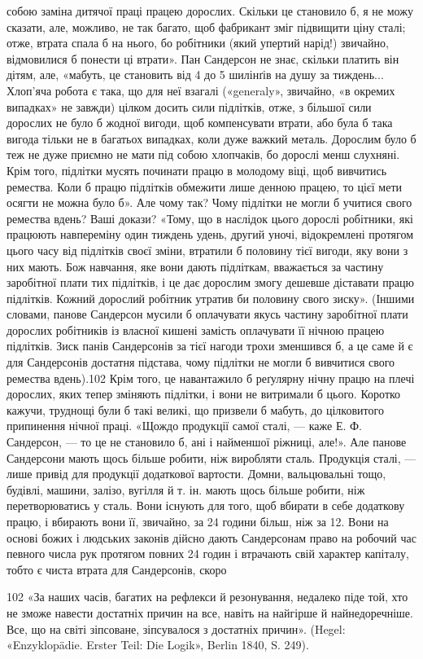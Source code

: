 собою заміна дитячої праці працею дорослих. Скільки це становило
б, я не можу сказати, але, можливо, не так багато, щоб фабрикант
зміг підвищити ціну сталі; отже, втрата спала б на нього,
бо робітники (який упертий нарід!) звичайно, відмовилися б
понести ці втрати». Пан Сандерсон не знає, скільки платить він
дітям, але, «мабуть, це становить від 4 до 5 шилінґів на душу за
тиждень... Хлоп’яча робота є така, що для неї взагалі («generaly»,
звичайно, «в окремих випадках» не завжди) цілком досить
сили підлітків, отже, з більшої сили дорослих не було б жодної
вигоди, щоб компенсувати втрати, або була б така вигода тільки
не в багатьох випадках, коли дуже важкий металь. Дорослим
було б теж не дуже приємно не мати під собою хлопчаків, бо дорослі
менш слухняні. Крім того, підлітки мусять починати працю
в молодому віці, щоб вивчитись ремества. Коли б працю підлітків
обмежити лише денною працею, то цієї мети осягти не можна
було б». Але чому так? Чому підлітки не могли б учитися свого
ремества вдень? Ваші докази? «Тому, що в наслідок цього дорослі
робітники, які працюють навпереміну один тиждень удень,
другий уночі, відокремлені протягом цього часу від підлітків
своєї зміни, втратили б половину тієї вигоди, яку вони з них
мають. Бож навчання, яке вони дають підліткам, вважається за
частину заробітної плати тих підлітків, і це дає дорослим змогу
дешевше діставати працю підлітків. Кожний дорослий робітник
утратив би половину свого зиску». (Іншими словами, панове
Сандерсон мусили б оплачувати якусь частину заробітної плати
дорослих робітників із власної кишені замість оплачувати її
нічною працею підлітків. Зиск панів Сандерсонів за тієї нагоди
трохи зменшився б, а це саме й є для Сандерсонів достатня підстава,
чому підлітки не могли б вивчитися свого ремества вдень).102
Крім того, це навантажило б реґулярну нічну працю на плечі
дорослих, яких тепер зміняють підлітки, і вони не витримали б
цього. Коротко кажучи, труднощі були б такі великі, що призвели б
мабуть, до цілковитого припинення нічної праці. «Щождо продукції
самої сталі, — каже Е. Ф. Сандерсон, — то це не становило б,
ані і найменшої ріжниці, але!». Але панове Сандерсони мають
щось більше робити, ніж виробляти сталь. Продукція сталі, —
лише привід для продукції додаткової вартости. Домни, вальцювальні
тощо, будівлі, машини, залізо, вугілля й т. ін. мають
щось більше робити, ніж перетворюватись у сталь. Вони існують
для того, щоб вбирати в себе додаткову працю, і вбирають вони
її, звичайно, за 24 години більш, ніж за 12. Вони на основі божих
і людських законів дійсно дають Сандерсонам право на робочий
час певного числа рук протягом повних 24 годин і втрачають свій
характер капіталу, тобто є чиста втрата для Сандерсонів, скоро

102 «За наших часів, багатих на рефлекси й резонування, недалеко
піде той, хто не зможе навести достатніх причин на все, навіть на найгірше
й найнедоречніше. Все, що на світі зіпсоване, зіпсувалося з достатніх
причин». (Hegel: «Enzyklopädie. Erster Teil: Die Logik», Berlin
1840, S. 249).
